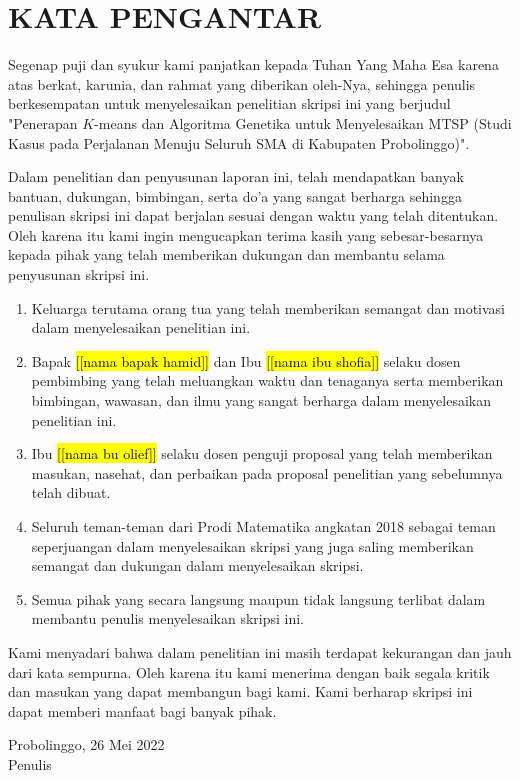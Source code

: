 \newpage
{}

\chapter*{KATA PENGANTAR}

Segenap puji dan syukur kami panjatkan kepada Tuhan Yang Maha Esa karena atas berkat, karunia, dan rahmat yang diberikan oleh-Nya, sehingga penulis berkesempatan untuk menyelesaikan penelitian skripsi ini yang berjudul "Penerapan $K$-means dan Algoritma Genetika untuk Menyelesaikan MTSP (Studi Kasus pada Perjalanan Menuju Seluruh SMA di Kabupaten Probolinggo)".

Dalam penelitian dan penyusunan laporan ini, telah mendapatkan banyak bantuan, dukungan, bimbingan, serta do'a yang sangat berharga sehingga penulisan skripsi ini dapat berjalan sesuai dengan waktu yang telah ditentukan.
Oleh karena itu kami ingin mengucapkan terima kasih yang sebesar-besarnya kepada pihak yang telah memberikan dukungan dan membantu selama penyusunan skripsi ini.

\begin{enumerate}
	\item Keluarga terutama orang tua yang telah memberikan semangat dan motivasi dalam menyelesaikan penelitian ini.
	\item Bapak \hl{[[nama bapak hamid]]} dan Ibu \hl{[[nama ibu shofia]]} selaku dosen pembimbing yang telah meluangkan waktu dan tenaganya serta memberikan bimbingan, wawasan, dan ilmu yang sangat berharga dalam menyelesaikan penelitian ini.
	\item Ibu \hl{[[nama bu olief]]} selaku dosen penguji proposal yang telah memberikan masukan, nasehat, dan perbaikan pada proposal penelitian yang sebelumnya telah dibuat.
	\item Seluruh teman-teman dari Prodi Matematika angkatan 2018 sebagai teman seperjuangan dalam menyelesaikan skripsi yang juga saling memberikan semangat dan dukungan dalam menyelesaikan skripsi.
	\item Semua pihak yang secara langsung maupun tidak langsung terlibat dalam membantu penulis menyelesaikan skripsi ini.
\end{enumerate}

Kami menyadari bahwa dalam penelitian ini masih terdapat kekurangan dan jauh dari kata sempurna. Oleh karena itu kami menerima dengan baik segala kritik dan masukan yang dapat membangun bagi kami. Kami berharap skripsi ini dapat memberi manfaat bagi banyak pihak.

\begin{flushright}
Probolinggo, 26 Mei 2022\\
Penulis
\end{flushright}